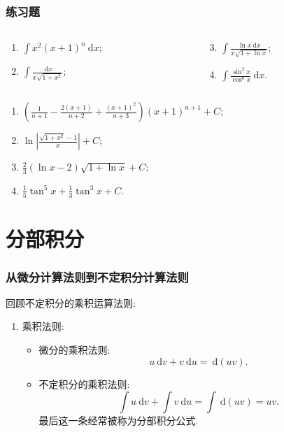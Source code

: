 \documentclass[
10pt,
aspectratio=43,
]{beamer}
\begin{document}
\begin{frame}
	\frametitle{练习题}
	\everymath{\displaystyle}
	\begin{block}{}
		\begin{columns}[onlytextwidth]
			\begin{column}{0.5\textwidth}
				\begin{enumerate}
					\item $\int x^2(x+1)^n \mathrm{~d} x$;
					\item $\int \frac{\mathrm{~d} x}{x \sqrt{1+x^2}}$;
				\end{enumerate}
			\end{column}
			\begin{column}{0.5\textwidth}
				\begin{enumerate}
					\setcounter{enumi}{2}
					\item $\int \frac{\ln x \mathrm{~d} x}{x \sqrt{1+\ln x}}$;
					\item $\int \frac{\sin ^2 x}{\cos ^6 x} \mathrm{~d} x$.
				\end{enumerate}
			\end{column}
		\end{columns}
	\end{block}
	\begin{exampleblock}{}
		\begin{enumerate}
			\pause \item $\left(\frac{1}{n+1}-\frac{2(x+1)}{n+2}+\frac{(x+1)^2}{n+3}\right)(x+1)^{n+1}+C$;
			      \pause \item $\ln\left|\frac{\sqrt{1+x^2}-1}{x}\right|+C$;
			      \pause \item $\frac{2}{3}(\ln x-2) \sqrt{1+\ln x}+C$;
			      \pause \item $\frac{1}{5} \tan ^5 x+\frac{1}{3} \tan ^3 x+C$.
		\end{enumerate}
	\end{exampleblock}
\end{frame}

\section{分部积分}

\begin{frame}
	\frametitle{从微分计算法则到不定积分计算法则}
	\everymath{\displaystyle}
	回顾不定积分的乘积运算法则:\pause
	\begin{block}{}
		\begin{enumerate}
			\item 乘积法则:
			      \begin{itemize}
				      \item \pause 微分的乘积法则:
				            $$
					            u\mathrm{~d}v+v\mathrm{~d}u =\mathrm{~d}(uv).
				            $$
				      \item \pause 不定积分的乘积法则:
				            $$
					            \int u\mathrm{~d}v+\int v\mathrm{~d}u=\int\mathrm{~d}(uv) = uv.
				            $$
				            \pause 最后这一条经常被称为分部积分公式.
			      \end{itemize}
		\end{enumerate}
	\end{block}
\end{frame}
\end{document}
